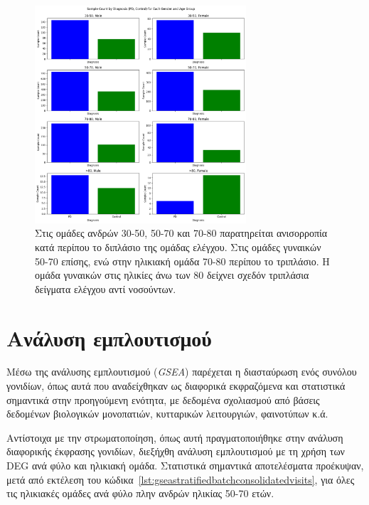 \documentclass[12pt]{report}
\begin{document}
            \begin{figure}[H]
                \centering
                \includegraphics[width=0.7\textwidth]{ML/ppmi-visual-bar-class-imb.png}
                \caption[Απεικόνιση ανισορροπίας μεταξύ των ομάδων της μελέτης] {Στις ομάδες ανδρών 30-50, 50-70 και 70-80 παρατηρείται ανισορροπία κατά περίπου το διπλάσιο της ομάδας ελέγχου. Στις ομάδες γυναικών 50-70 επίσης, ενώ στην ηλικιακή ομάδα 70-80 περίπου το τριπλάσιο. Η ομάδα γυναικών στις ηλικίες άνω των 80 δείχνει σχεδόν τριπλάσια δείγματα ελέγχου αντί νοσούντων.}
                \label{fig:ppmi-visual-bar-class-imb}
            \end{figure}
            \par
                
    \section{Ανάλυση εμπλουτισμού}
        \par 
            Μέσω της ανάλυσης εμπλουτισμού (\emph{GSEA}) παρέχεται η διασταύρωση ενός συνόλου γονιδίων, όπως αυτά που αναδείχθηκαν ως διαφορικά εκφραζόμενα και στατιστικά σημαντικά στην προηγούμενη ενότητα, με δεδομένα σχολιασμού από βάσεις δεδομένων βιολογικών μονοπατιών, κυτταρικών λειτουργιών, φαινοτύπων κ.ά.
        \par
            Αντίστοιχα με την στρωματοποίηση, όπως αυτή πραγματοποιήθηκε στην ανάλυση διαφορικής έκφρασης γονιδίων, διεξήχθη ανάλυση εμπλουτισμού με τη χρήση των DEG ανά φύλο και ηλικιακή ομάδα. Στατιστικά σημαντικά αποτελέσματα προέκυψαν, μετά από εκτέλεση του κώδικα~\ref{lst:gseastratifiedbatchconsolidatedvisits}, για όλες τις ηλικιακές ομάδες ανά φύλο πλην ανδρών ηλικίας 50-70 ετών.
            
\end{document}
